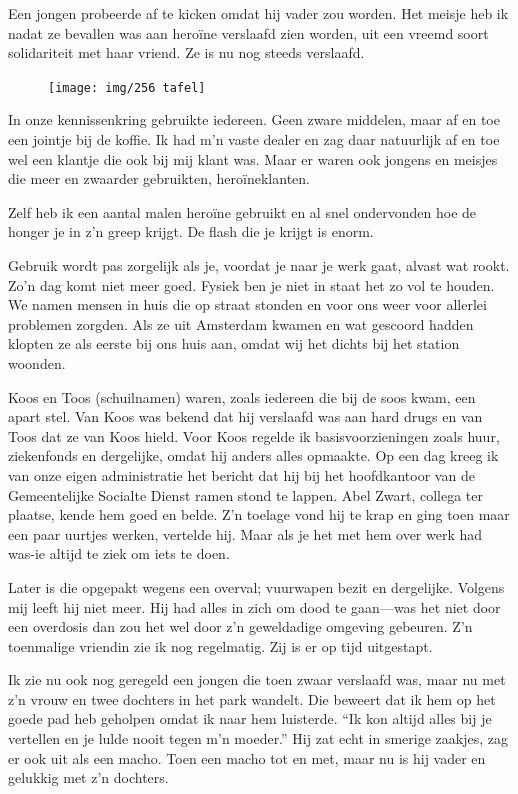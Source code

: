 \documentclass[10pt,twoside, openright]{memoir}
\begin{document}
Een jongen probeerde af te kicken omdat hij vader zou worden. Het meisje heb ik nadat ze bevallen was aan heroïne verslaafd zien worden, uit een vreemd soort solidariteit met haar vriend. Ze is nu nog steeds verslaafd. 

\begin{figure}
\texttt{[image: img/256 tafel]}
\end{figure}

In onze kennissenkring gebruikte iedereen. Geen zware middelen, maar af en toe een jointje bij de koffie. Ik had m’n vaste dealer en zag daar natuurlijk af en toe wel een klantje die ook bij mij klant was. Maar er waren ook jongens en meisjes die meer en zwaarder gebruikten, heroïneklanten. 

Zelf heb ik een aantal malen heroïne gebruikt en al snel ondervonden hoe de honger je in z’n greep krijgt. De flash die je krijgt is enorm.

Gebruik wordt pas zorgelijk als je, voordat je naar je werk gaat, alvast wat rookt. Zo’n dag komt niet meer goed. Fysiek ben je niet in staat het zo vol te houden. We namen mensen in huis die op straat stonden en voor ons weer voor allerlei problemen zorgden. Als ze uit Amsterdam kwamen en wat gescoord hadden klopten ze als eerste bij ons huis aan, omdat wij het dichts bij het station woonden. 

Koos en Toos (schuilnamen) waren, zoals iedereen die bij de soos kwam, een apart stel. Van Koos was bekend dat hij verslaafd was aan hard drugs en van Toos dat ze van Koos hield. Voor Koos regelde ik basisvoorzieningen zoals huur, ziekenfonds en dergelijke, omdat hij anders alles opmaakte. Op een dag kreeg ik van onze eigen administratie het bericht dat hij bij het hoofdkantoor van de Gemeentelijke Socialte Dienst ramen stond te lappen. Abel Zwart, collega ter plaatse, kende hem goed en belde. Z’n toelage vond hij te krap en ging toen maar een paar uurtjes werken, vertelde hij. Maar als je het met hem over werk had was-ie altijd te ziek om iets te doen. 

Later is die opgepakt wegens een overval; vuurwapen bezit en dergelijke. Volgens mij leeft hij niet meer. Hij had alles in zich om dood te gaan---was het niet door een overdosis dan zou het wel door z’n geweldadige omgeving gebeuren. Z’n toenmalige vriendin zie ik nog regelmatig. Zij is er op tijd uitgestapt.

Ik zie nu ook nog geregeld een jongen die toen zwaar verslaafd was, maar nu met z’n vrouw en twee dochters in het park wandelt. Die beweert dat ik hem op het goede pad heb geholpen omdat ik naar hem luisterde. ``Ik kon altijd alles bij je vertellen en je lulde nooit tegen m’n moeder.'' Hij zat echt in smerige zaakjes, zag er ook uit als een macho. Toen een macho tot en met, maar nu is hij vader en gelukkig met z’n dochters. 
\end{document}

